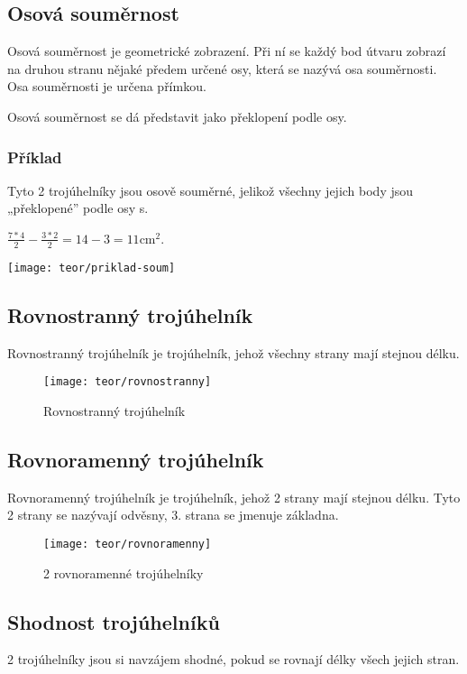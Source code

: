 \subsection{Osová souměrnost}

Osová souměrnost je geometrické zobrazení. Při ní se každý bod útvaru zobrazí na druhou stranu nějaké předem určené osy, která se nazývá osa souměrnosti. Osa souměrnosti je určena přímkou.

Osová souměrnost se dá představit jako překlopení podle osy.

\subsubsection{Příklad}
\begin{minipage}[t]{\linewidth}
    Tyto 2 trojúhelníky jsou osově souměrné, jelikož všechny jejich body jsou „překlopené” podle osy s.

    $ \frac{7*4}{2} - \frac{3*2}{2} =  14 - 3 = 11 \text{cm}^{2}$.
    \begin{center}
        \texttt{[image: teor/priklad-soum]}
    \end{center}
\end{minipage}

\subsection{Rovnostranný trojúhelník}
Rovnostranný trojúhelník je trojúhelník, jehož všechny strany mají stejnou délku.

\begin{figure}[h]
    \caption{Rovnostranný trojúhelník}
    \centering
    \texttt{[image: teor/rovnostranny]}
\end{figure}

\subsection{Rovnoramenný trojúhelník}
Rovnoramenný trojúhelník je trojúhelník, jehož 2 strany mají stejnou délku. Tyto 2 strany se nazývají odvěsny, 3. strana se jmenuje základna.

\begin{figure}[h]
    \caption{2 rovnoramenné trojúhelníky}
    \centering
    \texttt{[image: teor/rovnoramenny]}
\end{figure}

\subsection{Shodnost trojúhelníků}
2 trojúhelníky jsou si navzájem shodné, pokud se rovnají délky všech jejich stran.

